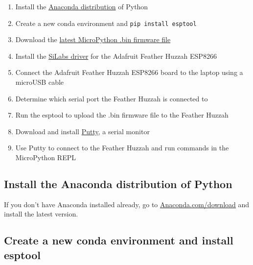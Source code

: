 \documentclass{book}
\providecommand{\tightlist}{%
      \setlength{\itemsep}{0pt}\setlength{\parskip}{0pt}}
\begin{document}
    
        \begin{enumerate}
\def\labelenumi{\arabic{enumi}.}
\tightlist
\item
  Install the \href{https://www.anaconda.com/download/}{Anaconda
  distribution} of Python
\item
  Create a new conda environment and \lstinline!pip install esptool!
\item
  Download the \href{http://micropython.org/download\#esp8266}{latest
  MicroPython .bin firmware file}
\item
  Install the
  \href{https://www.silabs.com/products/development-tools/software/usb-to-uart-bridge-vcp-drivers}{SiLabs
  driver} for the Adafruit Feather Huzzah ESP8266
\item
  Connect the Adafruit Feather Huzzah ESP8266 board to the laptop using
  a microUSB cable
\item
  Determine which serial port the Feather Huzzah is connected to
\item
  Run the esptool to upload the .bin firmware file to the Feather Huzzah
\item
  Download and install \href{https://www.putty.org/}{Putty}, a serial
  monitor
\item
  Use Putty to connect to the Feather Huzzah and run commands in the
  MicroPython REPL
\end{enumerate}
    




    
        \subsection{Install the Anaconda distribution of
Python}\label{install-the-anaconda-distribution-of-python}
    




    
        If you don't have Anaconda installed already, go to
\href{https://www.anaconda.com/download/}{Anaconda.com/download} and
install the latest version.
    




    
        \subsection{\texorpdfstring{Create a new conda environment and install
\textbf{esptool}}{Create a new conda environment and install esptool}}\label{create-a-new-conda-environment-and-install-esptool}
    
\end{document}
